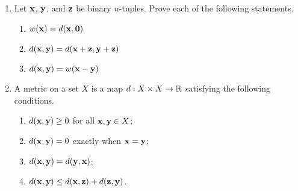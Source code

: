 {\begin{enumerate}
\begin{minipage}[t]{4.6in}
\begin{minipage}[t]{2.25in}
\begin{itemize}
 \item[{\bf (d)}]
 
\end{itemize}
\end{minipage}
\end{minipage}
 
\vspace{4pt}        %
 
 
 
 
 
\bf\item\rm
Let ${\bold x}$, ${\bold y}$, and ${\bold z}$ be binary $n$-tuples.
Prove each of the following statements. 
\begin{enumerate}
 
 \bf\item\rm
$w({\bold x}) = d( {\bold x}, {\bold 0})$
 
 \bf\item\rm
$d( {\bold x}, {\bold y}) = d( {\bold x} + {\bold z}, {\bold
y} + {\bold z} )$
 
 \bf\item\rm
$d({\bold x}, {\bold y}) = w({\bold x}- {\bold y})$
 
\end{enumerate}
 
 
\bf\item\rm
A {\bfi metric\/} on a set $X$ is a map $d: X \times X
\rightarrow {\Bbb R}$ satisfying the following conditions. 
\begin{enumerate}
 
 \bf\item\rm
$d( {\bold x}, {\bold y}) \geq 0$ for all ${\bold x}, {\bold y} \in
X$; 
 
 \bf\item\rm
$d( {\bold x}, {\bold y}) = 0$ exactly when ${\bold x} = {\bold y}$; 
 
 \bf\item\rm
$d( {\bold x}, {\bold y})= d( {\bold y}, {\bold x})$;
 
 \bf\item\rm
$d( {\bold x}, {\bold y}) \leq d( {\bold x}, {\bold z}) + d( {\bold
z}, {\bold y})$. 
 

\end{enumerate}
\end{enumerate}}
